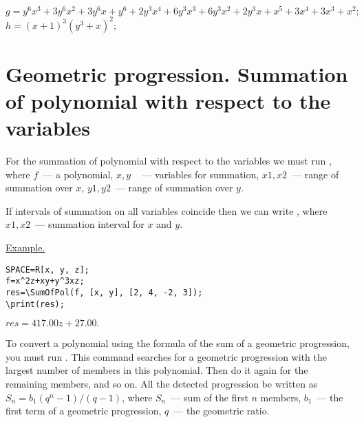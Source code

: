 {$g = y^6x^3+3y^6x^2+3y^6x+y^6+2y^3x^4+6y^3x^3+6y^3x^2+2y^3x+x^5+3x^4+3x^3+x^2;$\\
\hspace*{4mm} $h=(x+1)^3(y^3+x)^2;$}



\section{Geometric progression. Summation of polynomial with respect to the variables }

For the summation of polynomial with respect to the variables we must run 
, where
$ f $~--- a polynomial, $ x, y $ ~ --- variables for summation,
$ x1, x2 $~--- range of summation over $ x $,
$ y1, y2 $~--- range of summation over $ y $.


If intervals of summation on all variables coincide then we can write 
, where
$ x1, x2 $~--- summation interval for $ x $ and $ y $.

 

\underline{Example.}

\vspace*{-2mm}
\begin{verbatim}
SPACE=R[x, y, z];
f=x^2z+xy+y^3xz;
res=\SumOfPol(f, [x, y], [2, 4, -2, 3]);
\print(res);
\end{verbatim}

{$res = 417. 00z+27. 00.$}

To convert a polynomial using the formula of the sum of a geometric progression, you must run 
.
This command searches for a geometric progression with the largest number of members in this polynomial. 
Then do it again for the remaining members, and so on. All the detected progression be written as $ S_n = b_1 (q ^ n-1) / (q-1) $, where
$ S_n $~--- sum of the first $ n $ members, $ b_1 $~--- the first term of a geometric progression, $ q $~--- the geometric ratio.
 
